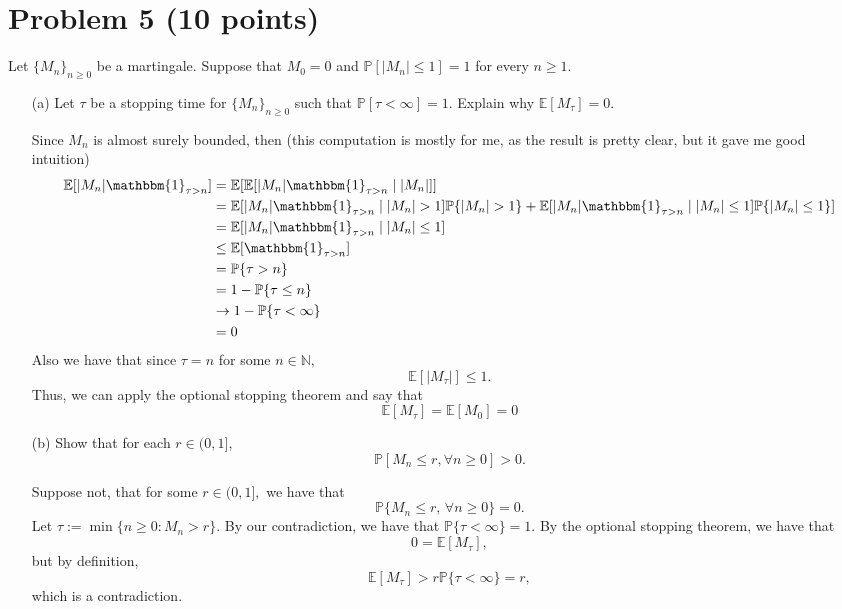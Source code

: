 \documentclass[11pt]{article}
\newcommand{\bbE}{\mathbb{E}}
\newcommand{\bbN}{\mathbb{N}}
\newcommand{\bbP}{\mathbb{P}}
\begin{document}
\newpage

\section*{Problem 5 (10 points)}
Let \(\{M_n\}_{n \geq 0}\) be a martingale. Suppose that \(M_0 = 0\) and \(\mathbb{P}[|M_n| \leq 1] = 1\) for every \(n \geq 1\).

\begin{itemize}
    \item[(a)] Let \(\tau\) be a stopping time for \(\{M_n\}_{n \geq 0}\) such that \(\mathbb{P}[\tau < \infty] = 1\). Explain why \(\mathbb{E}[M_\tau] = 0\).
    \begin{solution}
        Since $M_n$ is almost surely bounded, then (this computation is mostly for me, as the result is pretty clear, but it gave me good intuition)
        \begin{align*}
            \bbE[|M_n|\mathbbm{1}_{\tau >n}] &=\bbE[\bbE[|M_n|\mathbbm{1}_{\tau >n} \mid |M_n|]]\\
            &= \bbE[|M_n| \mathbbm{1}_{\tau>n} \mid |M_n| >1]\bbP\{|M_n| >1 \} + \bbE[|M_n|\mathbbm{1}_{\tau>n} \mid |M_n| \leq 1]\bbP\{|M_n| \leq 1 \}]\\
            &= \bbE[|M_n|\mathbbm{1}_{\tau>n} \mid |M_n| \leq 1]\\
            &\leq \bbE[\mathbbm{1}_{\tau >n}]\\
            &= \bbP\{\tau >n\}\\
            &= 1- \bbP\{\tau \leq n\}\\
            &\to 1- \bbP\{\tau < \infty\}\\
            &= 0
        \end{align*}
        Also we have that since $\tau = n$ for some $n \in \bbN,$
        \[\bbE[|M_\tau|] \leq 1.\] Thus, we can apply the optional stopping theorem and say that 
        \[\bbE[M_\tau]= \bbE[M_0] = 0\]
    \end{solution}
    \item[(b)] Show that for each \(r \in (0, 1]\),
    \[
    \mathbb{P}[M_n \leq r, \forall n \geq 0] > 0.
    \]
    \begin{solution}
        Suppose not, that for some $r \in (0,1],$ we have that 
        \[\bbP\{M_n \leq r, \,\forall  n \geq 0\} = 0.\] Let $\tau:= \min\{n \geq 0 : M_n >r\}.$ By our contradiction, we have that $\bbP\{\tau < \infty\} = 1.$ By the optional stopping theorem, we have that 
        \[0 = \bbE[M_\tau],\] but by definition, 
        \[\bbE[M_\tau] > r \bbP\{\tau < \infty\} = r,\] which is a contradiction.
    \end{solution}
\end{itemize}
\end{document}
